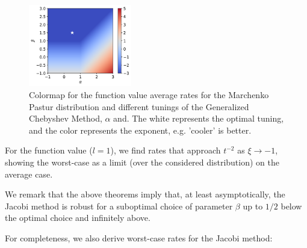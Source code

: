 \documentclass{article}
\begin{document}
\begin{figure}
    \centering
    \includegraphics[width=0.4\textwidth]{new_imgs/cmap.png}
    \begin{small}
    \caption{Colormap for the function value average rates  for the Marchenko Pastur distribution and different tunings of the Generalized Chebyshev Method, $\alpha$ and. The white represents the optimal tuning, and the color represents the exponent, e.g. 'cooler' is better.}
    \end{small}
    \vspace{-2 cm}
\end{figure}


For the function value ($l=1$), we find rates that approach $t^{-2}$ as $\xi\rightarrow -1$, showing the worst-case as a limit (over the considered distribution) on the average case.

We remark that the above theorems imply that, at least asymptotically, the Jacobi method is robust for a suboptimal choice of parameter $\beta$ up to $1/2$ below the optimal choice and infinitely above. 


For completeness, we also derive worst-case rates for the Jacobi method:
\vspace{1.5 cm}
\end{document}

